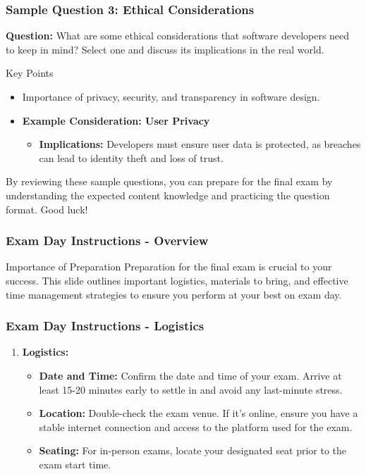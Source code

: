 \documentclass[aspectratio=169]{beamer}
\begin{document}
\begin{frame}[fragile]
    \frametitle{Sample Question 3: Ethical Considerations}
    \textbf{Question:} What are some ethical considerations that software developers need to keep in mind? Select one and discuss its implications in the real world.

    \begin{block}{Key Points}
        \begin{itemize}
            \item Importance of privacy, security, and transparency in software design.
            \item \textbf{Example Consideration: User Privacy}
            \begin{itemize}
                \item \textbf{Implications:} Developers must ensure user data is protected, as breaches can lead to identity theft and loss of trust.
            \end{itemize}
        \end{itemize}
    \end{block}

    By reviewing these sample questions, you can prepare for the final exam by understanding the expected content knowledge and practicing the question format. Good luck!
\end{frame}

\begin{frame}[fragile]
    \frametitle{Exam Day Instructions - Overview}
    \begin{block}{Importance of Preparation}
        Preparation for the final exam is crucial to your success. 
        This slide outlines important logistics, materials to bring, and effective time management strategies to ensure you perform at your best on exam day.
    \end{block}
\end{frame}

\begin{frame}[fragile]
    \frametitle{Exam Day Instructions - Logistics}
    \begin{enumerate}
        \item \textbf{Logistics:}
            \begin{itemize}
                \item \textbf{Date and Time:} Confirm the date and time of your exam. Arrive at least 15-20 minutes early to settle in and avoid any last-minute stress.
                \item \textbf{Location:} Double-check the exam venue. If it's online, ensure you have a stable internet connection and access to the platform used for the exam.
                \item \textbf{Seating:} For in-person exams, locate your designated seat prior to the exam start time.
            \end{itemize}
    \end{enumerate}
\end{frame}
\end{document}
